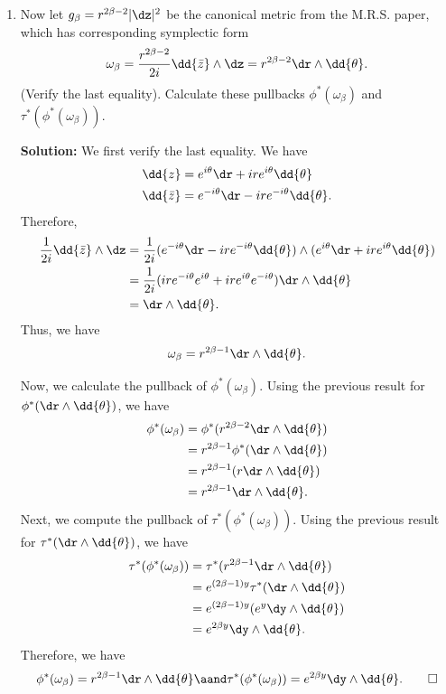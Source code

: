 \documentclass[notitlepage]{report}
\begin{document}
\begin{enumerate}
    \item Now let $g_\beta = r^{2\beta-2}|\dz|^2$ be the canonical metric from the M.R.S. paper, which has corresponding symplectic form
      \[%
        \omega_\beta = \frac{r^{2\beta-2}}{2i} \dd{\bar{z}} \wedge \dz = r^{2\beta-2} \dr \wedge \dd{\theta}
      .\]%
      (Verify the last equality). Calculate these pullbacks $\phi^*(\omega_\beta)$ and $\tau^*(\phi^*(\omega_\beta))$.

      \textbf{Solution:} We first verify the last equality. We have
      \begin{align*}
        \dd{z} &= e^{i\theta} \dr + ire^{i\theta} \dd{\theta} \\
        \dd{\bar{z}} &= e^{-i\theta} \dr - ire^{-i\theta} \dd{\theta}
      .\end{align*}
      Therefore,
      \begin{align*}
        \frac{1}{2i} \dd{\bar{z}} \wedge \dz &= \frac{1}{2i} (e^{-i\theta} \dr - ire^{-i\theta} \dd{\theta}) \wedge (e^{i\theta} \dr + ire^{i\theta} \dd{\theta}) \\
                                           &= \frac{1}{2i} (ire^{-i\theta} e^{i\theta} + ire^{i\theta} e^{-i\theta}) \dr \wedge \dd{\theta} \\
                                           &= \dr \wedge \dd{\theta}
      .\end{align*}
      Thus, we have
      \[%
        \omega_\beta = r^{2\beta-1} \dr \wedge \dd{\theta}
      .\]%

      Now, we calculate the pullback of $\phi^*(\omega_\beta)$. Using the previous result for $\phi^*(\dr \wedge \dd{\theta})$, we have
      \begin{align*}
        \phi^*(\omega_\beta) &= \phi^*(r^{2\beta-2} \dr \wedge \dd{\theta}) \\
                            &= r^{2\beta-1} \phi^*(\dr \wedge \dd{\theta}) \\
                            &= r^{2\beta-1} (r \dr \wedge \dd{\theta}) \\
                            &= r^{2\beta-1} \dr \wedge \dd{\theta}
      .\end{align*}
      Next, we compute the pullback of $\tau^*(\phi^*(\omega_\beta))$. Using the previous result for $\tau^*(\dr \wedge \dd{\theta})$, we have
      \begin{align*}
        \tau^*(\phi^*(\omega_\beta)) &= \tau^*(r^{2\beta-1} \dr \wedge \dd{\theta}) \\
                                    &= e^{(2\beta-1)y} \tau^*(\dr \wedge \dd{\theta}) \\
                                    &= e^{(2\beta-1)y} (e^y \dy \wedge \dd{\theta}) \\
                                    &= e^{2\beta y} \dy \wedge \dd{\theta}
      .\end{align*}
      Therefore, we have
      \[%
        \phi^*(\omega_\beta) = r^{2\beta-1} \dr \wedge \dd{\theta} \aand \tau^*(\phi^*(\omega_\beta)) = e^{2\beta y} \dy \wedge \dd{\theta}
      .\tag*{$\square$}\]%


\end{enumerate}
\end{document}
